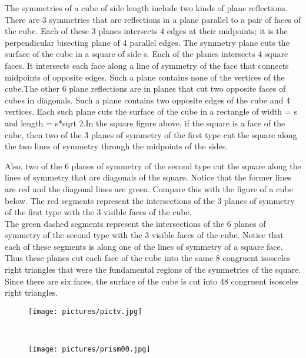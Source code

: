 \documentclass{article}
\begin{document}
The symmetries of a cube of side length include two kinds of plane reflections.
There are 3 symmetries that are reflections in a plane parallel to a pair of faces of the cube. Each of these 3 planes intersects 4 edges at their midpoints; it is the perpendicular bisecting plane of 4 parallel edges.  The symmetry plane cuts the surface of the cube in a square of side s.  Each of the planes intersects 4 square faces. It intersects each face along a line of symmetry of the face that connects midpoints of opposite edges. Such a plane contains none of the vertices of the cube.The other 6 plane reflections are in planes that cut two opposite faces of cubes in diagonals.  Such a plane contains two opposite edges of the cube and 4 vertices.  Each such plane cuts the surface of the cube in a rectangle of width = s and length = s*sqrt 2.In the square figure above, if the square is a face of the cube, then two of the 3 planes of symmetry of the first type cut the square along the two lines of symmetry through the midpoints of the sides.  

Also, two of the 6 planes of symmetry of the second type cut the square along the lines of symmetry that are diagonals of the square.  Notice that the former lines are red and the diagonal lines are green. Compare this with the figure of a cube below.  The red segments represent the intersections of the 3 planes of symmetry of the first type with the 3 visible faces of the cube.  \\

The green dashed segments represent the intersections of the 6 planes of symmetry of the second type with the 3 visible faces of the cube.  Notice that each of these segments is along one of the lines of symmetry of a square face. Thus these planes cut each face of the cube into the same 8 congruent isosceles right triangles that were the fundamental regions of the symmetries of the square.  Since there are six faces, the surface of the cube is cut into 48 congruent isosceles right triangles.

\begin{figure}[htp]
    \texttt{[image: pictures/pictv.jpg]}
\end{figure}
 \vspace{4cm}

\\

\begin{figure}[htp]
\texttt{[image: pictures/prism00.jpg]}
\end{figure}\\
\end{document}
